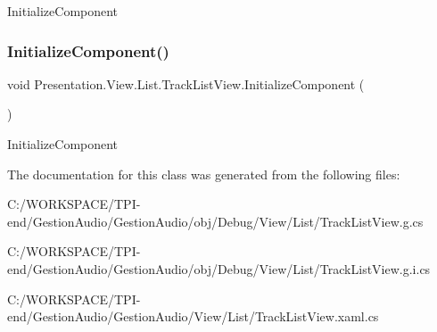 Initialize\+Component 

\mbox{\label{class_presentation_1_1_view_1_1_list_1_1_track_list_view_a86e2e69667d5d62053af1e28d00daaee}} 
\subsubsection{\texorpdfstring{Initialize\+Component()}{InitializeComponent()}\hspace{0.1cm}{\footnotesize\ttfamily [4/4]}}
{\footnotesize\ttfamily void Presentation.\+View.\+List.\+Track\+List\+View.\+Initialize\+Component (\begin{DoxyParamCaption}{ }\end{DoxyParamCaption})}



Initialize\+Component 



The documentation for this class was generated from the following files\+:\begin{DoxyCompactItemize}
\item 
C\+:/\+W\+O\+R\+K\+S\+P\+A\+C\+E/\+T\+P\+I-\/end/\+Gestion\+Audio/\+Gestion\+Audio/obj/\+Debug/\+View/\+List/Track\+List\+View.\+g.\+cs\item 
C\+:/\+W\+O\+R\+K\+S\+P\+A\+C\+E/\+T\+P\+I-\/end/\+Gestion\+Audio/\+Gestion\+Audio/obj/\+Debug/\+View/\+List/Track\+List\+View.\+g.\+i.\+cs\item 
C\+:/\+W\+O\+R\+K\+S\+P\+A\+C\+E/\+T\+P\+I-\/end/\+Gestion\+Audio/\+Gestion\+Audio/\+View/\+List/Track\+List\+View.\+xaml.\+cs\end{DoxyCompactItemize}
